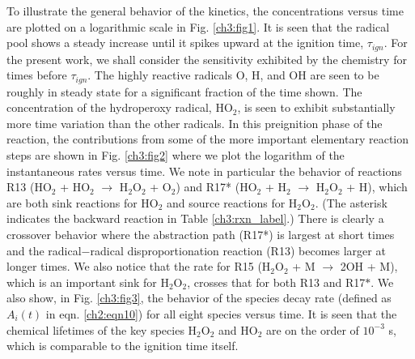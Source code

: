 To illustrate the general behavior of the kinetics, the
concentrations versus time are plotted on a logarithmic scale
in Fig. \ref{ch3:fig1}. It is seen that the radical pool shows a steady increase until it spikes upward at the ignition time, $\tau_{ign}$. For the
present work, we shall consider the sensitivity exhibited by the
chemistry for times before $\tau_{ign}$. The highly reactive radicals O,
H, and OH are seen to be roughly in steady state for a
significant fraction of the time shown. The concentration of the
hydroperoxy radical, HO$_2$, is seen to exhibit substantially more
time variation than the other radicals. In this preignition phase
of the reaction, the contributions from some of the more
important elementary reaction steps are shown in Fig. \ref{ch3:fig2} where we plot the logarithm of the instantaneous rates versus
time. We note in particular the behavior of reactions R13 (HO$_2$
+ HO$_2$ $\rightarrow$ H$_2$O$_2$ + O$_2$) and R17* (HO$_2$ + H$_2$ $\rightarrow$ H$_2$O$_2$ + H),
which are both sink reactions for HO$_2$ and source reactions for
H$_2$O$_2$. (The asterisk indicates the backward reaction in Table
\ref{ch3:rxn_label}.) There is clearly a crossover behavior where the abstraction
path (R17*) is largest at short times and the radical−radical
disproportionation reaction (R13) becomes larger at longer
times. We also notice that the rate for R15 (H$_2$O$_2$ + M $\rightarrow$ 2OH
+ M), which is an important sink for H$_2$O$_2$, crosses that for
both R13 and R17$\ast$. We also show, in Fig. \ref{ch3:fig3}, the behavior of
the species decay rate (defined as $A_i(t)$ in eqn. \ref{ch2:eqn10}) for all eight
species versus time. It is seen that the chemical lifetimes of the
key species H$_2$O$_2$ and HO$_2$ are on the order of $10^{-3}$ s, which is
comparable to the ignition time itself.
\newline
